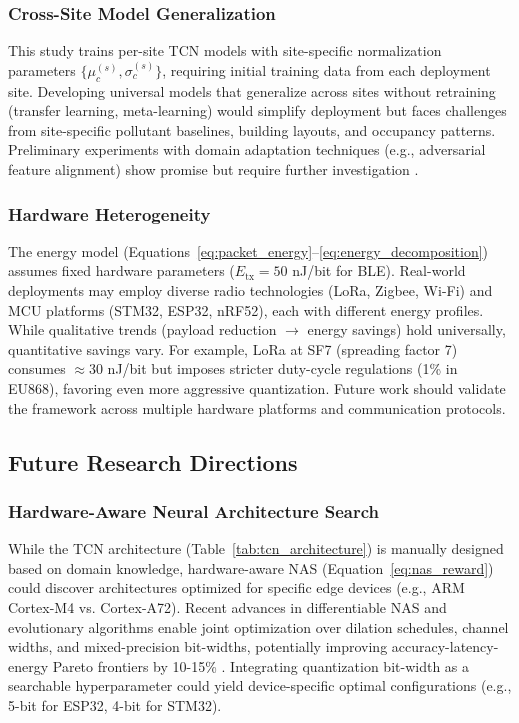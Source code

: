 \subsubsection{Cross-Site Model Generalization}

This study trains per-site TCN models with site-specific normalization parameters $\{\mu_c^{(s)}, \sigma_c^{(s)}\}$, requiring initial training data from each deployment site. Developing universal models that generalize across sites without retraining (transfer learning, meta-learning) would simplify deployment but faces challenges from site-specific pollutant baselines, building layouts, and occupancy patterns. Preliminary experiments with domain adaptation techniques (e.g., adversarial feature alignment) show promise but require further investigation \cite{nguyen2025aiot}.

\subsubsection{Hardware Heterogeneity}

The energy model (Equations~\eqref{eq:packet_energy}--\eqref{eq:energy_decomposition}) assumes fixed hardware parameters ($E_{\text{tx}} = 50$ nJ/bit for BLE). Real-world deployments may employ diverse radio technologies (LoRa, Zigbee, Wi-Fi) and MCU platforms (STM32, ESP32, nRF52), each with different energy profiles. While qualitative trends (payload reduction $\rightarrow$ energy savings) hold universally, quantitative savings vary. For example, LoRa at SF7 (spreading factor 7) consumes $\approx$30 nJ/bit but imposes stricter duty-cycle regulations (1\% in EU868), favoring even more aggressive quantization. Future work should validate the framework across multiple hardware platforms and communication protocols.

\subsection{Future Research Directions}

\subsubsection{Hardware-Aware Neural Architecture Search}

While the TCN architecture (Table~\ref{tab:tcn_architecture}) is manually designed based on domain knowledge, hardware-aware NAS (Equation~\eqref{eq:nas_reward}) could discover architectures optimized for specific edge devices (e.g., ARM Cortex-M4 vs. Cortex-A72). Recent advances in differentiable NAS and evolutionary algorithms enable joint optimization over dilation schedules, channel widths, and mixed-precision bit-widths, potentially improving accuracy-latency-energy Pareto frontiers by 10-15\% \cite{himeur2024edge}. Integrating quantization bit-width as a searchable hyperparameter could yield device-specific optimal configurations (e.g., 5-bit for ESP32, 4-bit for STM32).

